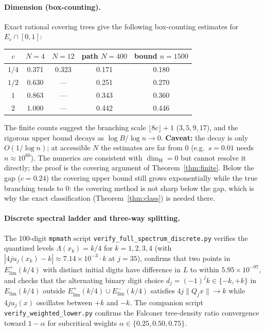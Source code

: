\documentclass[11pt]{article}
\theoremstyle{definition}
\theoremstyle{remark}
\newcommand{\dimH}{\dim_{\mathrm{H}}}
\newcommand{\Lam}{\Lambda}
\begin{document}
\paragraph{Dimension (box-counting).} Exact rational covering trees give the
following box-counting estimates for $E_c\cap[0,1]$:
\begin{center}
\begin{tabular}{c|cccc}
$c$ & $N=4$ & $N=12$ & path $N=400$ & bound $n=1500$\\\hline
$1/4$ & 0.371 & 0.323 & 0.171 & 0.180\\
$1/2$ & 0.630 & --- & 0.251 & 0.270\\
$1$   & 0.863 & --- & 0.343 & 0.360\\
$2$   & 1.000 & --- & 0.442 & 0.446
\end{tabular}
\end{center}
The finite counts suggest the branching scale $\lfloor8c\rfloor+1$ ($3,5,9,17$), and
the rigorous upper bound decays as $\log B/\log n\to0$. \textbf{Caveat:} the
decay is only $O(1/\log n)$; at accessible $N$ the estimates are far from $0$
(e.g.\ $s=0.01$ needs $n\approx10^{60}$). The numerics are consistent with
$\dimH=0$ but cannot resolve it directly; the proof is the covering argument of
Theorem~\ref{thm:finite}. Below the gap ($c=0.24$) the covering upper bound
still grows exponentially while the true branching tends to $0$: the covering
method is not sharp below the gap, which is why the exact classification
(Theorem~\ref{thm:class}) is needed there.

\paragraph{Discrete spectral ladder and three-way splitting.} The 100-digit
\texttt{mpmath} script \texttt{verify\_\allowbreak full\_\allowbreak spectrum\_\allowbreak discrete.py} verifies
the quantized levels $\Lam(x_k)=k/4$ for $k=1,2,3,4$ (with $|4ju_j(x_k)-k|\approx7.14\times10^{-3}\cdot k$ at $j=35$), confirms that two points in
$E_{\mathrm{lim}}^+(k/4)$ with distinct initial digits have difference in $L$ to
within $5.95\times10^{-97}$, and checks that the alternating binary digit choice
$d_j=(-1)^j k\in\{-k,+k\}$ in $E_{\mathrm{lim}}(k/4)$ outside $E_{\mathrm{lim}}^+(k/4)\cup E_{\mathrm{lim}}^-(k/4)$ satisfies $4j\|Q_jx\|\to k$ while $4ju_j(x)$ oscillates
between $+k$ and $-k$. The companion script \texttt{verify\_\allowbreak weighted\_\allowbreak lower.py}
confirms the Falconer tree-density ratio convergence toward $1-\alpha$ for
subcritical weights $\alpha\in\{0.25,0.50,0.75\}$.
\end{document}
